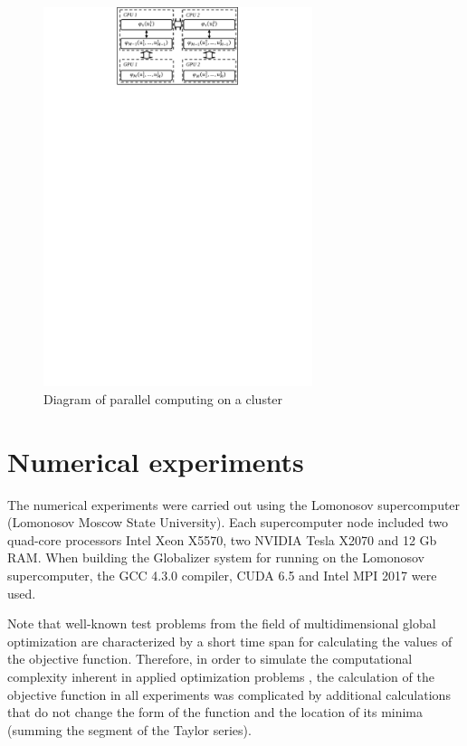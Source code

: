 \documentclass{svproc}
\begin{document}
   \begin{figure}[h!]
    \centering
		\includegraphics[width=0.7\textwidth]{Parallel_Computing.pdf}
		\caption{Diagram of parallel computing on a cluster}\label{fig:Parallel_Computing}
\end{figure}

\section{Numerical experiments}

The numerical experiments were carried out using the Lomonosov supercomputer (Lomonosov Moscow State University). Each supercomputer node included two quad-core processors Intel Xeon X5570, two NVIDIA Tesla X2070 and 12 Gb RAM. When building the Globalizer system for running on the Lomonosov supercomputer, the GCC 4.3.0 compiler, CUDA 6.5 and Intel MPI 2017 were used.

Note that well-known test problems from the field of multidimensional global optimization are characterized by a short time span for calculating the values of the objective function. Therefore, in order to simulate the computational complexity inherent in applied optimization problems \cite{Modorskii2016}, the calculation of the objective function in all experiments was complicated by additional calculations that do not change the form of the function and the location of its minima (summing the segment of the Taylor series).
\end{document}
